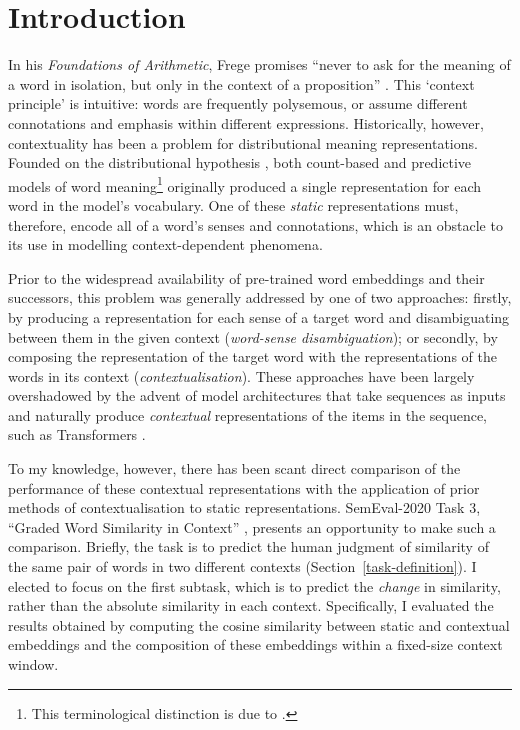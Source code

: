 
\section{Introduction}

In his \emph{Foundations of Arithmetic}, Frege promises ``never to ask for the meaning
of a word in isolation, but only in the context of a proposition''
\parencite*[xvii]{Frege1980}.
This `context principle' is intuitive: words are frequently polysemous, or assume
different connotations and emphasis within different expressions.
Historically, however, contextuality has been a problem for distributional meaning
representations.
Founded on the distributional hypothesis \parencites{Harris1954}{Firth1957}, both
count-based and predictive models of word meaning\footnote{ This terminological
  distinction is due to \textcite{Baroni2014a}.
} originally
produced a single representation for each word in the model's vocabulary.
One of these \emph{static} representations must, therefore, encode all of a word's
senses and connotations, which is an obstacle to its use in modelling context-dependent
phenomena.

Prior to the widespread availability of pre-trained word embeddings
\parencites[e.g.,][]{Mikolov2013}{Pennington2014} and their successors, this problem was
generally addressed by one of two approaches: firstly, by producing a representation
for each sense of a target word and disambiguating between them in the given context
(\emph{word-sense disambiguation}); or secondly, by composing the representation of the
target word with the representations of the words in its context
(\emph{contextualisation}).
These approaches have been largely overshadowed by the advent of model architectures
that take sequences as inputs and naturally produce \emph{contextual} representations
of the items in the sequence, such as Transformers \parencite{Vaswani2017}.

To my knowledge, however, there has been scant direct comparison of the performance of
these contextual representations with the application of prior methods of
contextualisation to static representations.
SemEval-2020 Task 3, ``Graded Word Similarity in Context''
\parencite{Armendariz2020a}, presents an opportunity to make such a comparison.
Briefly, the task is to predict the human judgment of similarity of the same pair of
words in two different contexts (Section~\ref{task-definition}).
I elected to focus on the first subtask, which is to predict the \emph{change} in
similarity, rather than the absolute similarity in each context.
Specifically, I evaluated the results obtained by computing the cosine similarity
between static and contextual embeddings and the composition of these embeddings within
a fixed-size context window.

